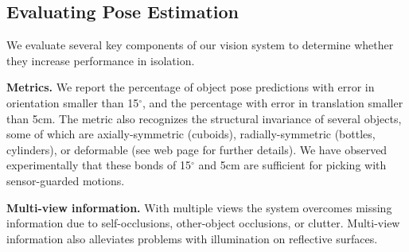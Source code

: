\documentclass[letterpaper, 10 pt, conference]{ieeeconf}  %
\newcommand{\myparagraph}[1]{\vspace{0.1in}\noindent\textbf{#1}}
\begin{document}


\subsection{Evaluating Pose Estimation}

We evaluate several key components of our vision system to determine whether they increase performance in isolation.


\myparagraph{Metrics.} We report the percentage of object pose predictions with error in orientation smaller than 15$^{\circ}$, and the percentage with error in translation smaller than 5cm. The metric also recognizes the structural invariance of several objects, some of which are axially-symmetric (cuboids), radially-symmetric (bottles, cylinders), or deformable (see web page \cite{projectwebsite} for further details). We have observed experimentally that these bonds of 15$^{\circ}$ and 5cm are sufficient for picking with sensor-guarded motions.


\myparagraph{Multi-view information.} With multiple views the system overcomes missing information due to self-occlusions,  other-object occlusions, or clutter. Multi-view information also alleviates problems with illumination on reflective surfaces. 
\end{document}
